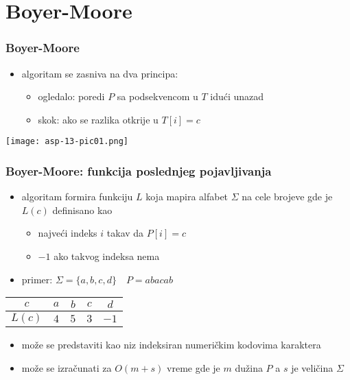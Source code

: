 \documentclass[compress,aspectratio=169]{beamer}
\begin{document}
\section[BM]{Boyer-Moore}

\begin{frame}[fragile]
  \frametitle{Boyer-Moore}
  \begin{itemize}
    \item {} algoritam se zasniva na dva principa:
    \begin{itemize}
      \item ogledalo: poredi $P$ sa podsekvencom u $T$ idući unazad
      \item skok: ako se razlika otkrije u $T[i]=c$
    \end{itemize}
  \end{itemize}
  \begin{center}
    \texttt{[image: asp-13-pic01.png]}
  \end{center}
\end{frame}

\begin{frame}[fragile]
  \frametitle{Boyer-Moore: funkcija poslednjeg pojavljivanja}
  \begin{itemize}
    \item {} algoritam formira  funkciju $L$ koja
    mapira alfabet $\Sigma$ na cele brojeve gde je $L(c)$ definisano kao
    \begin{itemize}
      \item najveći indeks $i$ takav da $P[i]=c$
      \item $-1$ ako takvog indeksa nema
    \end{itemize}
    \item primer: $\Sigma = \{a,b,c,d\} \quad P = abacab$
  \end{itemize}
  \begin{center}
    \begin{tabular}{c||c|c|c|c}
    $c$ & $a$ & $b$ & $c$ & $d$ \\ \hline
    $L(c)$ & $4$ & $5$ & $3$ & $-1$ \\
    \end{tabular}
  \end{center}
  \begin{itemize}
    \item može se predstaviti kao niz indeksiran numeričkim kodovima karaktera
    \item može se izračunati za $O(m+s)$ vreme gde je $m$ dužina $P$ a $s$ je veličina $\Sigma$
  \end{itemize}
\end{frame}
\end{document}
